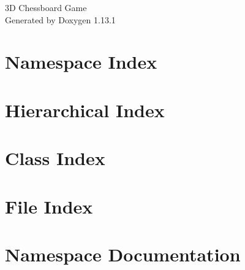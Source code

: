 \documentclass[twoside]{book}
\newcommand{\+}{\discretionary{\mbox{\scriptsize$\hookleftarrow$}}{}{}}
\newcommand{\clearemptydoublepage}{%
    \newpage{\pagestyle{empty}\cleardoublepage}%
  }
\begin{document}
  \raggedbottom
    \hypersetup{pageanchor=false,
                bookmarksnumbered=true,
                pdfencoding=unicode
               }
  \begin{titlepage}
  \vspace*{7cm}
  \begin{center}%
  {\Large 3\+D Chessboard Game}\\
  \vspace*{1cm}
  {\large Generated by Doxygen 1.13.1}\\
  \end{center}
  \end{titlepage}
  \clearemptydoublepage
  \tableofcontents
  \clearemptydoublepage
  \hypersetup{pageanchor=true}
\chapter{Namespace Index}

\chapter{Hierarchical Index}

\chapter{Class Index}

\chapter{File Index}

\chapter{Namespace Documentation}

\end{document}
